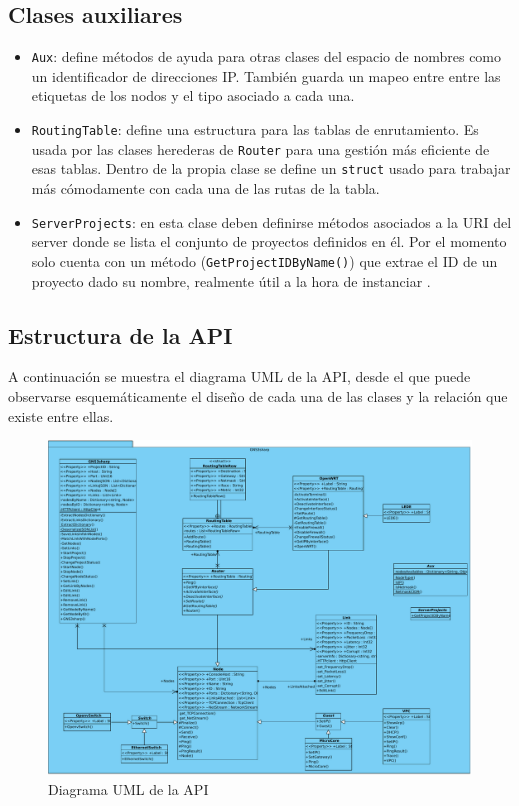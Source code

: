 \subsection{Clases auxiliares}\label{subsec:aux}
\begin{itemize}
\item \texttt{Aux}: define métodos de ayuda para otras clases del espacio de nombres como un identificador de direcciones IP. También guarda un mapeo entre entre las etiquetas de los nodos y el tipo asociado a cada una.
\item \texttt{RoutingTable}: define una estructura para las tablas de enrutamiento. Es usada por las clases herederas de \texttt{Router} para una gestión más eficiente de esas tablas. Dentro de la propia clase se define un \texttt{struct} usado para trabajar más cómodamente con cada una de las rutas de la tabla. 
\item \texttt{ServerProjects}: en esta clase deben definirse métodos asociados a la URI del server donde se lista el conjunto de proyectos definidos en él. Por el momento solo cuenta con un método (\texttt{GetProjectIDByName()}) que extrae el ID de un proyecto dado su nombre, realmente útil a la hora de instanciar \GNSCS.
\end{itemize}

\subsection{Estructura de la API}
A continuación se muestra el diagrama UML de la API, desde el que puede observarse esquemáticamente el diseño de cada una de las clases y la relación que existe entre ellas.

\begin{figure}[h]
  \centering
  \includegraphics[scale=0.4]{imagenes/diagrama_api2}
  \caption{Diagrama UML de la API}
  \label{fig:uml_api}
\end{figure}

